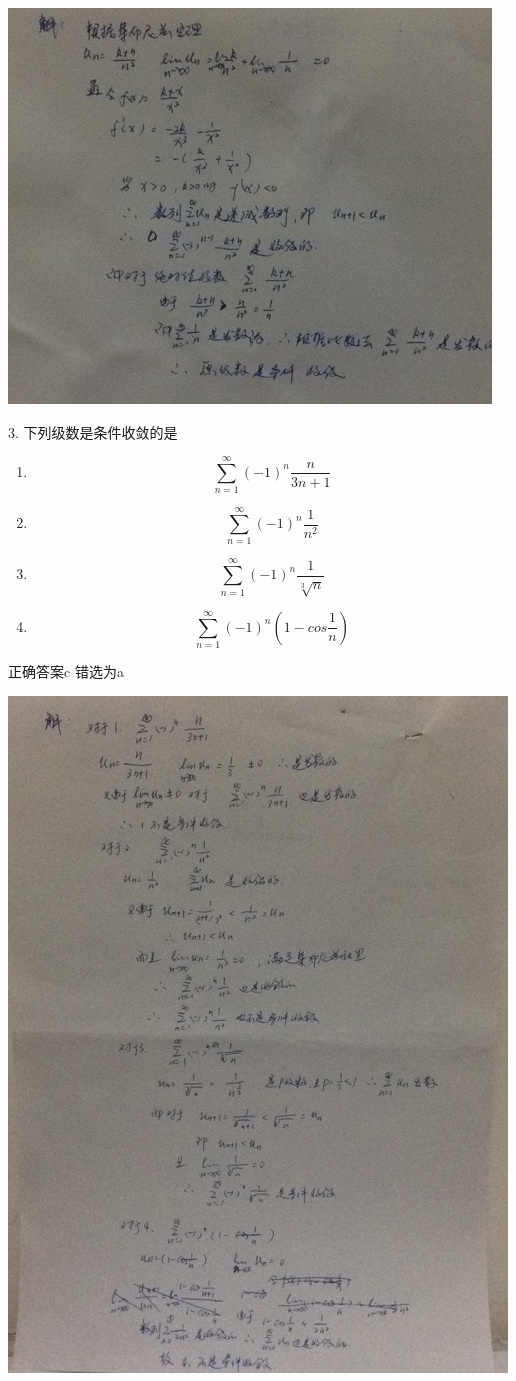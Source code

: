 \documentclass[fleqn]{article}
\begin{document}
\begin{flushleft}
\includegraphics[scale=0.5]{32.jpg}

3. 下列级数是条件收敛的是
\begin{enumerate}
	\item $$\sum_{n=1}^{\infty}(-1)^n\frac{n}{3n+1}$$
	\item $$\sum_{n=1}^{\infty}(-1)^n\frac{1}{n^2}$$
	\item $$\sum_{n=1}^{\infty}(-1)^n\frac{1}{\sqrt[3]n}$$
	\item $$\sum_{n=1}^{\infty}(-1)^n (1-cos\frac{1}{n})$$
\end{enumerate}
正确答案c 错选为a

\includegraphics[scale=0.5]{33.jpg}


\end{flushleft}
\end{document}
